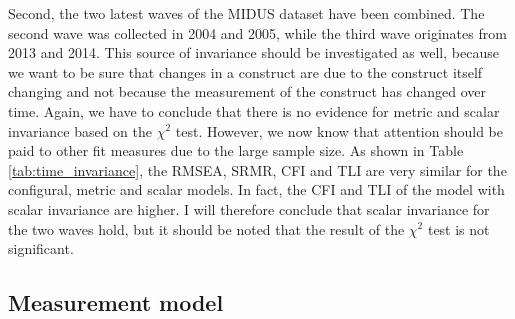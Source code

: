 \documentclass[11pt]{article}
\begin{document}
\begin{table}[h]
\captionsetup{singlelinecheck=off}
\caption{Time measurement invariance}
\label{tab:time_invariance}
\end{table}

Second, the two latest waves of the MIDUS dataset have been combined. The second
wave was collected in 2004 and 2005, while the third wave originates from 2013
and 2014. This source of invariance should be investigated as well, because we
want to be sure that changes in a construct are due to the construct itself
changing and not because the measurement of the construct has changed over time.
Again, we have to conclude that there is no evidence for metric and scalar
invariance based on the $\chi^2$ test. However, we now know that attention
should be paid to other fit measures due to the large sample size. As shown in
Table \ref{tab:time_invariance}, the RMSEA, SRMR, CFI and TLI are very similar
for the configural, metric and scalar models. In fact, the  CFI and TLI of the
model with scalar invariance are higher. I will therefore conclude that scalar
invariance for the two waves hold, but it should be noted that the result of the
$\chi^2$ test is not significant.

\FloatBarrier\subsection{Measurement model}
\end{document}
